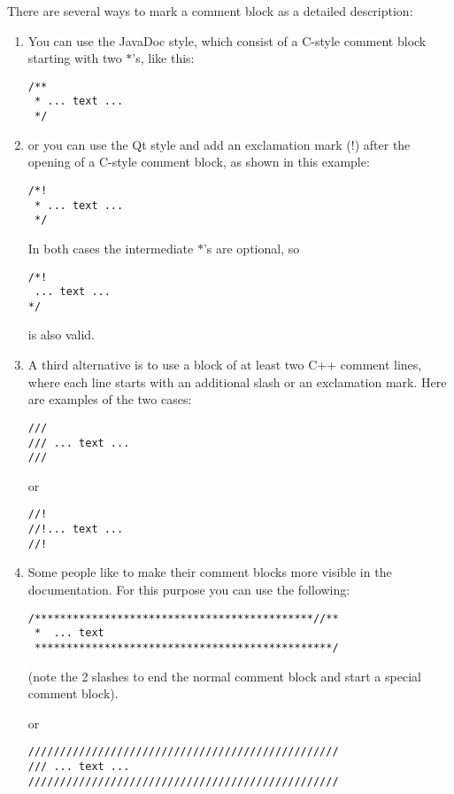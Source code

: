 There are several ways to mark a comment block as a detailed description: \begin{enumerate}
\item You can use the JavaDoc style, which consist of a C-style comment block starting with two $\ast$'s, like this:



\footnotesize\begin{verbatim}
/**
 * ... text ...
 */
\end{verbatim}
\normalsize


\item or you can use the Qt style and add an exclamation mark (!) after the opening of a C-style comment block, as shown in this example:



\footnotesize\begin{verbatim}
/*!
 * ... text ...
 */
\end{verbatim}
\normalsize


In both cases the intermediate $\ast$'s are optional, so



\footnotesize\begin{verbatim}
/*!
 ... text ...
*/
\end{verbatim}
\normalsize


is also valid.

\item A third alternative is to use a block of at least two C++ comment lines, where each line starts with an additional slash or an exclamation mark. Here are examples of the two cases:



\footnotesize\begin{verbatim}
///
/// ... text ...
///
\end{verbatim}
\normalsize


or



\footnotesize\begin{verbatim}
//!
//!... text ...
//!
\end{verbatim}
\normalsize


\item 

Some people like to make their comment blocks more visible in the documentation. For this purpose you can use the following:



\footnotesize\begin{verbatim}
/********************************************//**
 *  ... text
 ***********************************************/
\end{verbatim}
\normalsize
 (note the 2 slashes to end the normal comment block and start a special comment block).

or



\footnotesize\begin{verbatim}
/////////////////////////////////////////////////
/// ... text ...
/////////////////////////////////////////////////
\end{verbatim}
\normalsize


\end{enumerate}


